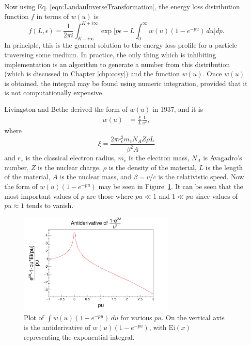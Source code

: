 Now using Eq. \eqref{eqn:LandauInverseTransformation}, the energy loss distribution function $f$ in terms of $w(u)$ is 
\begin{equation} \label{eqn:LandauGeneralSolution}
f(L,\epsilon)=\frac{1}{2\pi i} \int_{K-i\infty} ^{K+i\infty} \exp\Big[p\epsilon-L\int_0 ^\infty w(u)  (1-e^{-pu})\, du\Big] dp.
\end{equation}
In principle, this is the general solution to the energy loss profile for a particle traversing some medium. In practice, the only thing which is inhibiting implementation is an algorithm to generate a number from this distribution (which is discussed in Chapter \ref{chp:cosy}) and the function $w(u)$. Once $w(u)$ is obtained, the integral may be found using numeric integration, provided that it is not computationally expensive.

Livingston and Bethe \cite{livingston} derived the form of $w(u)$ in 1937, and it is
\begin{align*}
w(u)&=\frac{\xi}{L}\frac{1}{u^2},
\end{align*}
where
\begin{equation}\label{eqn:xi}
\xi=\frac{2\pi r_e ^2 m_e N_A Z\rho L}{\beta^2 A}
\end{equation}
and $r_e$ is the classical electron radius, $m_e$ is the electron mass, $N_A$ is Avagadro's number, $Z$ is the nuclear charge, $\rho$ is the density of the material, $L$ is the length of the material, $A$ is the nuclear mass, and $\beta=v/c$ is the relativistic speed. Now the form of $w(u)(1-e^{-pu})$ may be seen in Figure~\ref{fig:landauPUPlot}. It can be seen that the most important values of $p$ are those where $pu \ll 1$ and $1 \ll pu$ since values of $pu\approx 1$ tends to vanish.

\begin{figure}[h!]
  \centering
    \includegraphics[width=0.7\textwidth]{Figures/landauPUPlot} 
  \caption[Plot of $\int w(u)(1-e^{-pu})\ du$.]{Plot of $\int w(u)(1-e^{-pu})\ du$ for various $pu$. On the vertical axis is the antiderivative of $w(u)(1-e^{-pu})$, with $\text{Ei}(x)$ representing the exponential integral.}
  \label{fig:landauPUPlot}
\end{figure}


